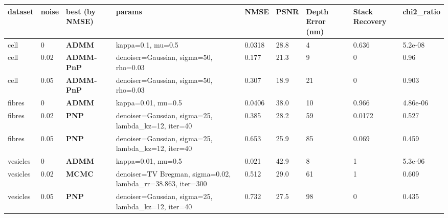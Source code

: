 \begin{center}\begin{minipage}{\linewidth}\centering
{}
\begin{adjustbox}{max width=\linewidth}
\begin{tabular}{lllllllll}
\toprule
dataset & noise & best (by NMSE) & params & NMSE & PSNR & Depth Error (nm) & Stack Recovery & chi2\_ratio \\
\midrule
cell & 0 & \textbf{ADMM} & kappa=0.1, mu=0.5 & 0.0318 & 28.8 & 4 & 0.636 & 5.2e-08 \\
cell & 0.02 & \textbf{ADMM-PnP} & denoiser=Gaussian, sigma=50, rho=0.03 & 0.177 & 21.3 & 9 & 0 & 0.96 \\
cell & 0.05 & \textbf{ADMM-PnP} & denoiser=Gaussian, sigma=50, rho=0.03 & 0.307 & 18.9 & 21 & 0 & 0.903 \\
fibres & 0 & \textbf{ADMM} & kappa=0.01, mu=0.5 & 0.0406 & 38.0 & 10 & 0.966 & 4.86e-06 \\
fibres & 0.02 & \textbf{PNP} & denoiser=Gaussian, sigma=25, lambda\_kz=12, iter=40 & 0.385 & 28.2 & 59 & 0.0172 & 0.527 \\
fibres & 0.05 & \textbf{PNP} & denoiser=Gaussian, sigma=25, lambda\_kz=12, iter=40 & 0.653 & 25.9 & 85 & 0.069 & 0.459 \\
vesicles & 0 & \textbf{ADMM} & kappa=0.01, mu=0.5 & 0.021 & 42.9 & 8 & 1 & 5.3e-06 \\
vesicles & 0.02 & \textbf{MCMC} & denoiser=TV Bregman, sigma=0.02, lambda\_rr=38.863, iter=300 & 0.512 & 29.0 & 61 & 1 & 0.609 \\
vesicles & 0.05 & \textbf{PNP} & denoiser=Gaussian, sigma=25, lambda\_kz=12, iter=40 & 0.732 & 27.5 & 98 & 0 & 0.435 \\
\bottomrule
\end{tabular}\end{adjustbox}\end{minipage}\end{center}
